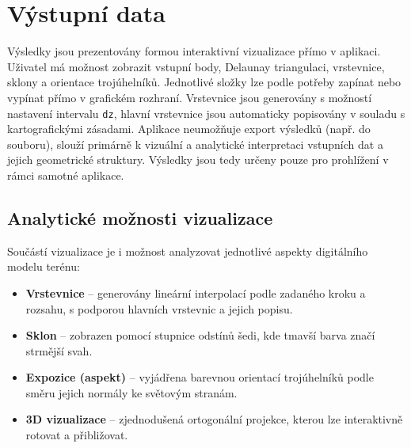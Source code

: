 \section{Výstupní data}
Výsledky jsou prezentovány formou interaktivní vizualizace přímo v aplikaci. Uživatel má možnost zobrazit vstupní body, Delaunay triangulaci, vrstevnice, sklony a orientace trojúhelníků. Jednotlivé složky lze podle potřeby zapínat nebo vypínat přímo v grafickém rozhraní. Vrstevnice jsou generovány s možností nastavení intervalu \texttt{dz}, hlavní vrstevnice jsou automaticky popisovány v souladu s kartografickými zásadami. Aplikace neumožňuje export výsledků (např. do souboru), slouží primárně k vizuální a analytické interpretaci vstupních dat a jejich geometrické struktury. Výsledky jsou tedy určeny pouze pro prohlížení v rámci samotné aplikace.

\subsection*{Analytické možnosti vizualizace}

Součástí vizualizace je i možnost analyzovat jednotlivé aspekty digitálního modelu terénu:
\begin{itemize}
    \item \textbf{Vrstevnice} – generovány lineární interpolací podle zadaného kroku a rozsahu, s podporou hlavních vrstevnic a jejich popisu.
    \item \textbf{Sklon} – zobrazen pomocí stupnice odstínů šedi, kde tmavší barva značí strmější svah.
    \item \textbf{Expozice (aspekt)} – vyjádřena barevnou orientací trojúhelníků podle směru jejich normály ke světovým stranám.
    \item \textbf{3D vizualizace} – zjednodušená ortogonální projekce, kterou lze interaktivně rotovat a přibližovat.
\end{itemize}
